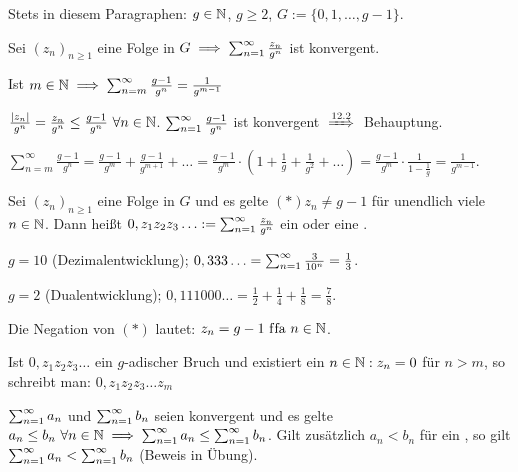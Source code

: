 \documentclass[a4paper,twoside,DIV15,BCOR12mm]{scrbook}
\begin{document}
\begin{vereinbarung}
Stets in diesem Paragraphen: $g\in\mathbb{N}$, $g\ge 2$, $G := \{0,1,\ldots,g-1\}$.
\end{vereinbarung}

\begin{satz}
\begin{liste}
\item Sei $(z_n)_{n\ge1}$ eine Folge in $G \implies \sum_{n=1}^{\infty}{\frac{z_n}{g^n}}$ ist konvergent.
\item Ist $m\in\mathbb{N} \implies \sum_{n=m}^\infty{\frac{g-1}{g^n}} = \frac{1}{g^{m-1}}$
\end{liste}
\end{satz}

\begin{beweise}
\item $\frac{|z_n|}{g^n} = \frac{z_n}{g^n} \le \frac{g-1}{g^n} \ \forall n\in\mathbb{N}$. $\sum_{n=1}^{\infty}{\frac{g-1}{g^n}}$ ist konvergent $\folgtnach{12.2}$ Behauptung.
\item $\sum_{n=m}^\infty\frac{g-1}{g^n} = \frac{g-1}{g^m} + \frac{g-1}{g^{m+1}} + \ldots = \frac{g-1}{g^m} \cdot ( 1+ \frac{1}{g} + \frac{1}{g^2} + \ldots ) = \frac{g-1}{g^m} \cdot \frac{1}{1-\frac{1}{g}} = \frac{1}{g^{m-1}}$.
\end{beweise}

\begin{definition}
Sei $(z_n)_{n\ge 1}$ eine Folge in  $G$ und es gelte $(*) z_n \ne g-1$ für unendlich viele $n\in\mathbb{N}$. Dann heißt $0,z_1z_2z_3\ldots := \sum_{n=1}^{\infty}{\frac{z_n}{g^n}}$ ein  oder eine .
\end{definition}

\begin{beispiele}
\item $g=10$ (Dezimalentwicklung); $0,333\ldots = \sum_{n=1}^{\infty}{\frac{3}{10^n}} = \frac{1}{3}$.
\item $g=2$ (Dualentwicklung); $0,111000\ldots = \frac{1}{2} + \frac{1}{4} + \frac{1}{8} = \frac{7}{8}$.
\end{beispiele}

\begin{bemerkung}
\begin{liste}
\item Die Negation von $(*)$ lautet: $z_n = g-1 \text{ f\/fa } n\in\mathbb{N}$.
\item Ist $0,z_1z_2z_3\ldots$ ein $g$-adischer Bruch und existiert ein $n\in\mathbb{N}: z_n = 0$ für $n>m$, so schreibt man: $0,z_1z_2z_3\ldots z_m$
\item $\sum_{n=1}^{\infty}{a_n}$ und $\sum_{n=1}^{\infty}{b_n}$ seien konvergent und es gelte $a_n \le b_n \ \forall n\in\mathbb{N} \implies \sum_{n=1}^{\infty}{a_n} \le \sum_{n=1}^{\infty}{b_n}$. Gilt zusätzlich $a_n<b_n$ für ein \natn, so gilt $\sum_{n=1}^{\infty}{a_n} < \sum_{n=1}^{\infty}{b_n}$ (Beweis in Übung).
\end{liste}
\end{bemerkung}
\end{document}
